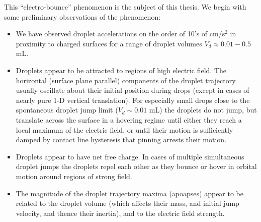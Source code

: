 \documentclass[10pt,a4paper]{article}
\begin{document}
This ``electro-bounce'' phenomenon is the subject of this thesis. We begin with some preliminary observations of the phenomenon:
\begin{itemize}
\item We have observed droplet accelerations on the order of 10's of cm/s$^2$ in proximity to charged surfaces for a range of droplet volumes $V_d \approx 0.01- 0.5$ mL.
\item Droplets appear to be attracted to regions of high electric field. The horizontal (surface plane parallel) components of the droplet trajectory usually oscillate about their initial position during drops (except in cases of nearly pure 1-D vertical translation). For especially small drops close to the spontaneous droplet jump limit ($V_d \sim 0.01$ mL) the droplets do not jump, but translate across the surface in a hovering regime until either they reach a local maximum of the electric field, or until their motion is sufficiently damped by contact line hysteresis that pinning arrests their motion.
\item Droplets appear to have net free charge. In cases of multiple simultaneous droplet jumps the droplets repel each other as they bounce or hover in orbital motion around regions of strong field.
\item The magnitude of the droplet trajectory maxima (apoapses) appear to be related to the droplet volume (which affects their mass, and initial jump velocity, and thence their inertia), and to the electric field strength.
\end{itemize}
\end{document}
